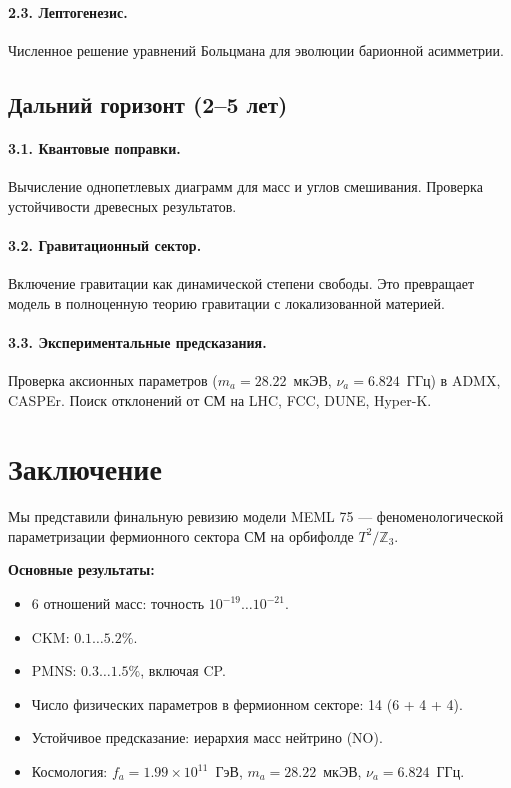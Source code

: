 \documentclass[11pt,a4paper]{article}
\numberwithin{equation}{section}
\begin{document}
\paragraph{2.3. Лептогенезис.}
Численное решение уравнений Больцмана для
эволюции барионной асимметрии.

\subsection{Дальний горизонт (2--5 лет)}

\paragraph{3.1. Квантовые поправки.}
Вычисление однопетлевых диаграмм для масс
и углов смешивания. Проверка устойчивости
древесных результатов.

\paragraph{3.2. Гравитационный сектор.}
Включение гравитации как динамической степени
свободы. Это превращает модель в полноценную
теорию гравитации с локализованной материей.

\paragraph{3.3. Экспериментальные предсказания.}
Проверка аксионных параметров ($m_a = 28.22$~мкЭВ,
$\nu_a = 6.824$~ГГц) в ADMX, CASPEr. Поиск
отклонений от СМ на LHC, FCC, DUNE, Hyper-K.

\section{Заключение}

Мы представили финальную ревизию модели MEML 75 ---
феноменологической параметризации фермионного
сектора СМ на орбифолде $T^2/\mathbb{Z}_3$.

\textbf{Основные результаты:}
\begin{itemize}[leftmargin=1.5em,itemsep=0.15em]
\item 6 отношений масс: точность $10^{-19}\ldots10^{-21}$.
\item CKM: $0.1\ldots 5.2\%$.
\item PMNS: $0.3\ldots 1.5\%$, включая CP.
\item Число физических параметров в фермионном
      секторе: 14 (6 + 4 + 4).
\item Устойчивое предсказание: иерархия масс
      нейтрино (NO).
\item Космология: $f_a = 1.99 \times 10^{11}$~ГэВ,
      $m_a = 28.22$~мкЭВ, $\nu_a = 6.824$~ГГц.
\end{itemize}
\end{document}
